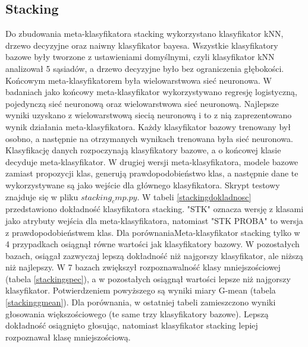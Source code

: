\subsection{Stacking}
Do zbudowania meta-klasyfikatora stacking wykorzystano klasyfikator kNN, drzewo decyzyjne oraz naiwny klasyfikator bayesa. Wszystkie klasyfikatory bazowe były tworzone z ustawieniami domyślnymi, czyli klasyfikator kNN analizował 5 sąsiadów, a drzewo decyzyjne było bez ograniczenia głębokości. Końcowym meta-klasyfikatorem była wielowarstwowa sieć neuronowa. W badaniach jako końcowy meta-klasyfikator wykorzystywano regresję logistyczną, pojedynczą sieć neuronową oraz wielowarstwowa sieć neuronową. Najlepsze wyniki uzyskano z wielowarstwową siecią neuronową i to z nią zaprezentowano wynik działania meta-klasyfikatora. Każdy klasyfikator bazowy trenowany był osobno, a następnie na otrzymanych wynikach trenowana była sieć neuronowa. Klasyfikację danych rozpoczynają klasyfikatory bazowe, a o końcowej klasie decyduje meta-klasyfikator. W drugiej wersji meta-klasyfikatora, modele bazowe zamiast propozycji klas, generują prawdopodobieństwo klas, a następnie dane te wykorzystywane są jako wejście dla głównego klasyfikatora. Skrypt testowy znajduje się w pliku $stacking_cmp.py$. W tabeli \ref{stackingdokladnosc} przedstawiono dokładność klasyfikatora stacking. "STK" oznacza wersję z klasami jako atrybuty wejścia dla meta-klasyfikatora, natomiast "STK PROBA" to wersja z prawdopodobieństwem klas. Dla porównaniaMeta-klasyfikator stacking tylko w 4 przypadkach osiągnął równe wartości jak klasyfikatory bazowy. W pozostałych bazach, osiągał zazwyczaj lepszą dokładność niż najgorszy klasyfikator, ale niższą niż najlepszy. W 7 bazach zwiększył rozpoznawalność klasy mniejszościowej (tabela \ref{stackingspec}), a w pozostałych osiągnął wartości lepsze niż najgorszy klasyfikator. Potwierdzeniem powyższego są wyniki miary G-mean (tabela \ref{stackinggmean}). Dla porównania, w ostatniej tabeli zamieszczono wyniki głosowania większościowego (te same trzy klasyfikatory bazowe). Lepszą dokładność osiągnięto głosując, natomiast klasyfikator stacking lepiej rozpoznawał klasę mniejszościową.



